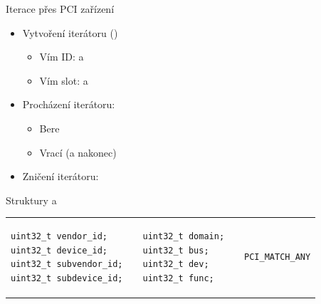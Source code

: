 \begin{frame}[fragile]{Iterace přes PCI zařízení}

  \begin{itemize}

    \item Vytvoření iterátoru ()
    \begin{itemize}
      \item Vím ID:  a
      \item Vím slot:  a
    \end{itemize}

    \pause

    \item Procházení iterátoru: 
    \begin{itemize}
      \item Bere 
      \item Vrací  (a  nakonec)
    \end{itemize}

    \pause

    \item Zničení iterátoru: 
  \end{itemize}


  \begin{block}{Struktury  a }
    \begin{tabular}{lp{}lp{}l}
      \begin{lstlisting}
uint32_t vendor_id;
uint32_t device_id;
uint32_t subvendor_id;
uint32_t subdevice_id;
      \end{lstlisting} &&
      \begin{lstlisting}
uint32_t domain;
uint32_t bus;
uint32_t dev;
uint32_t func;
      \end{lstlisting} &&
      \begin{lstlisting}
PCI_MATCH_ANY
      \end{lstlisting}
    \end{tabular}
  \end{block}


\end{frame}


